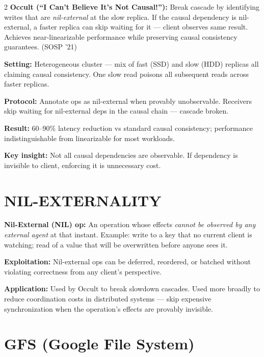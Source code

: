 \documentclass[9pt]{article}
\begin{document}
\begin{multicols*}{2}
\textbf{Occult (``I Can't Believe It's Not Causal!''):} Break cascade by identifying writes that are \emph{nil-external} at the slow replica. If the causal dependency is nil-external, a faster replica can skip waiting for it — client observes same result. Achieves near-linearizable performance while preserving causal consistency guarantees. (SOSP '21)

\textbf{Setting:} Heterogeneous cluster — mix of fast (SSD) and slow (HDD) replicas all claiming causal consistency. One slow read poisons all subsequent reads across faster replicas.

\textbf{Protocol:} Annotate ops as nil-external when provably unobservable. Receivers skip waiting for nil-external deps in the causal chain — cascade broken.

\textbf{Result:} 60--90\% latency reduction vs standard causal consistency; performance indistinguishable from linearizable for most workloads.

\textbf{Key insight:} Not all causal dependencies are observable. If dependency is invisible to client, enforcing it is unnecessary cost.

\section*{NIL-EXTERNALITY}

\textbf{Nil-External (NIL) op:} An operation whose effects \emph{cannot be observed by any external agent} at that instant. Example: write to a key that no current client is watching; read of a value that will be overwritten before anyone sees it.

\textbf{Exploitation:} Nil-external ops can be deferred, reordered, or batched without violating correctness from any client's perspective.

\textbf{Application:} Used by Occult to break slowdown cascades. Used more broadly to reduce coordination costs in distributed systems — skip expensive synchronization when the operation's effects are provably invisible.

\section*{GFS (Google File System)}


\end{multicols*}
\end{document}
